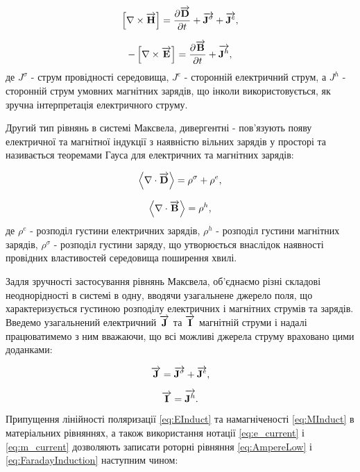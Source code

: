 \begin{equation} \label{eq:AmpereLow}
\left[ \nabla \times \overrightarrow{\mathbf H} \right] = 
\frac{\partial \overrightarrow{\mathbf D}}{\partial t} + \overrightarrow{\mathbf J^\sigma} + \overrightarrow{\mathbf J^e},
\end{equation}

\begin{equation} \label{eq:FaradayInduction}
- \left[ \nabla \times \overrightarrow{\mathbf E} \right] =
\frac{\partial \overrightarrow{\mathbf B}}{\partial t} + \overrightarrow{\mathbf J^h},
\end{equation}
%
де $ J^\sigma $ - струм провідності середовища, $ J^e $ - сторонній 
електричний струм, а $ J^h $ - сторонній струм умовних магнітних зарядів, що
інколи використовується, як зручна інтерпретація електричного струму.

Другий тип рівнянь в системі Максвела, дивергентні - пов'язують появу 
електричної та магнітної індукції з наявністю вільних зарядів у просторі 
та називається теоремами Гауса для електричних та магнітних зарядів:

\begin{equation} \label{eq:GaussTheorem}
\left< \nabla \cdot \overrightarrow{\mathbf D} \right> = \rho^\sigma + \rho^e,
\end{equation}

\begin{equation} \label{eq:GaussMagnetic}
\left< \nabla \cdot \overrightarrow{\mathbf B} \right> = \rho^h,
\end{equation}
%
де $ \rho^e $ - розподіл густини електричних зарядів, $ \rho^h $ - розподіл
густини магнітних зарядів, $ \rho^\sigma $ - розподіл густини заряду, що
утворюється внаслідок наявності провідних властивостей середовища 
поширення хвилі.

Задля зручності застосування рівнянь Максвела, об'єднаємо різні складові 
неоднорідності в системі в одну, вводячи узагальнене джерело поля, що 
характеризується густиною розподілу електричних і магнітних струмів та 
зарядів. Введемо узагальнений електричний $ \overrightarrow{\mathbf J} $ та $ \overrightarrow{\mathbf I} $ магнітній 
струми і надалі працюватимемо з ним вважаючи, що всі можливі джерела струму 
враховано цими доданками:

\begin{equation} \label{eq:e_current}
\overrightarrow{\mathbf J} = \overrightarrow{\mathbf J^\sigma} + \overrightarrow{\mathbf J^e},
\end{equation}

\begin{equation} \label{eq:m_current}
\overrightarrow{\mathbf I} = \overrightarrow{\mathbf J^h}.
\end{equation}

Припущення лінійності поляризації \eqref{eq:EInduct} та намагніченості 
\eqref{eq:MInduct} в матеріальних рівняннях, а також використання нотації
\eqref{eq:e_current} і \eqref{eq:m_current} дозволяють записати роторні 
рівняння \eqref{eq:AmpereLow} і \eqref{eq:FaradayInduction} наступним чином:

